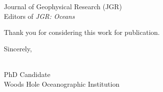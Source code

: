 \documentclass[12pt]{WHOIletter}
\begin{document}
\begin{letter}{
Journal of Geophysical Research (JGR) \\
Editors of {\it JGR: Oceans} \\
}


Thank you for considering this work for publication.

\closing{Sincerely,}
\WHOIname\\PhD Candidate\\Woods Hole Oceanographic Institution

\end{letter}
\end{document}
